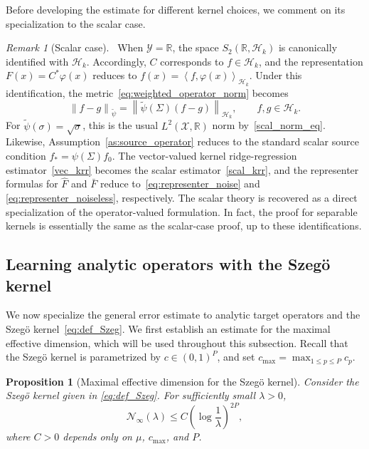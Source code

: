 \documentclass[11pt]{article}
\numberwithin{equation}{section}
\theoremstyle{plain}
\newtheorem{proposition}[theorem]{Proposition}
\theoremstyle{definition}
\theoremstyle{remark}
\newtheorem{remark}[theorem]{Remark}
\newcommand{\X}{\mathcal{X}}
\newcommand{\Hs}{\mathcal{H}}
\newcommand{\Y}{\mathcal{Y}}
\newcommand{\Real}{\mathbb{R}}
\newcommand{\norm}[1]{\left\lVert#1\right\rVert}
\newcommand{\innerpro}[1]{\left\langle#1\right\rangle}
\newcommand{\tpsi}{\widetilde{\psi}}
\begin{document}
Before developing the estimate for different kernel choices, we comment on its
specialization to the scalar case.

\begin{remark}[Scalar case]\
When $\Y=\Real$, the space $S_2(\Real,\Hs_k)$ is canonically identified with
$\Hs_k$. Accordingly, $C$ corresponds to $f\in\Hs_k$, and the representation
$F(x)=C^*\varphi(x)$ reduces to
\(
f(x)=\innerpro{f,\varphi(x)}_{\Hs_k}.
\)
Under this identification, the  metric~\eqref{eq:weighted_operator_norm} becomes
\[
\norm{f-g}_{\tpsi}
=
\norm{\tpsi(\Sigma)(f-g)}_{\Hs_k},
\qquad
f,g\in\Hs_k.
\]
For $\tpsi(\sigma)=\sqrt{\sigma}$, this is the usual
$L^2(\X,\Real)$ norm by~\eqref{scal_norm_eq}. Likewise,
Assumption~\ref{as:source_operator} reduces to the standard scalar source
condition
\(
f_*=\psi(\Sigma)f_0.
\)
The vector-valued kernel ridge-regression estimator~\eqref{vec_krr} becomes the
scalar estimator~\eqref{scal_krr}, and the representer formulas for $\hat{F}$
and $\bar{F}$ reduce to~\eqref{eq:representer_noise} and
\eqref{eq:representer_noiseless}, respectively.  The scalar theory
is recovered as a direct specialization of the operator-valued formulation.
In fact, the proof for separable kernels is essentially the same as the
scalar-case proof, up to these identifications.
\end{remark}

\subsection{Learning analytic operators with the Szegö kernel}
\label{subsec:szeg}

We now specialize the general error estimate to analytic target operators and
the Szegö kernel~\eqref{eq:def_Szeg}. We first establish an estimate for the
maximal effective dimension, which will be used throughout this subsection.
Recall that the Szegö kernel is parametrized by
$c\in (0,1)^P$, and set
\(
c_{\max}=\max_{1\leq p\leq P}c_p.
\)

\begin{proposition}[Maximal effective dimension for the Szegö kernel]
\label{prop:max_dof_szeg}
Consider the Szegö kernel given in
\eqref{eq:def_Szeg}. For sufficiently small $\lambda>0$,
\begin{equation}
\mathcal{N}_{\infty}(\lambda)
\leq
C
\left(\log\frac{1}{\lambda}\right)^{2P},
\label{eq:max_dof_main}
\end{equation}
where $C>0$ depends only on $\mu$, $c_{\max}$, and $P$.
\end{proposition}
\end{document}
